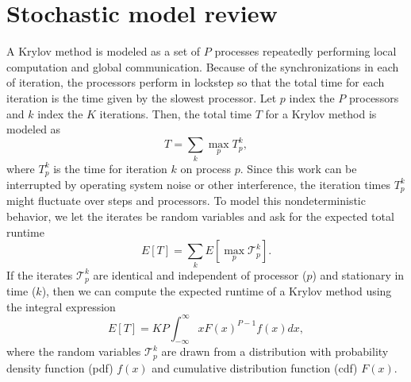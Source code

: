 \documentclass[sigconf]{acmart}
\begin{document}
\section{Stochastic model review} \label{sec:model-review}

A Krylov method is modeled as a set of $P$ processes repeatedly performing local computation and global communication. Because of the synchronizations in each of iteration, the processors perform in lockstep so that the total time for each iteration is the time given by the slowest processor. Let $p$ index the $P$ processors and $k$ index the $K$ iterations. Then, the total time $T$ for a Krylov method is modeled as
\begin{equation}
T = \sum_k \max_p T^k_p,
\end{equation}
where $T^k_p$ is the time for iteration $k$ on process $p$. Since this work can be interrupted by operating system noise or other interference, the iteration times $T^k_p$ might fluctuate over steps and processors. To model this nondeterministic behavior, we let the iterates be random variables and ask for the expected total runtime
\begin{equation}
E[T] = \sum_k E[ \max_p \mathcal{T}^k_p]. \label{eq:krylov-expression}
\end{equation}
If the iterates $\mathcal{T}^k_p$ are identical and independent of processor ($p$) and stationary in time ($k$), then we can compute the expected runtime of a Krylov method using the integral expression 
\begin{equation}
E[T] =  K P \int ^{\infty}_{-\infty} x F(x)^{P-1} f(x) dx \label{eq:krylov-model},
\end{equation}
where the random variables $\mathcal{T}^k_p$ are drawn from a distribution with probability density function (pdf) $f(x)$ and cumulative distribution function (cdf) $F(x)$. 
\end{document}
